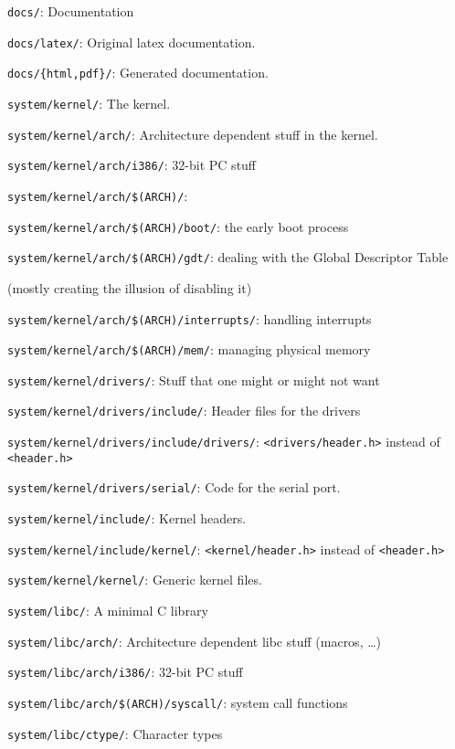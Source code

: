\documentclass[12pt]{article}
\newcommand{\code}[1]{\colorbox{light-gray}{\texttt{#1}}}
\begin{document}
\begin{list}{}{}
\item \code{docs/}: Documentation
\item \code{docs/latex/}: Original latex documentation.
\item \code{docs/\{html,pdf\}/}: Generated documentation.
\item \code{system/kernel/}: The kernel.
\item \code{system/kernel/arch/}: Architecture dependent stuff in the kernel.
\item \code{system/kernel/arch/i386/}: 32-bit PC stuff
\item \code{system/kernel/arch/\$(ARCH)/}:
\item \code{system/kernel/arch/\$(ARCH)/boot/}: the early boot process
\item \code{system/kernel/arch/\$(ARCH)/gdt/}: dealing with the Global Descriptor Table \begin{small}(mostly creating the illusion of disabling it)\end{small}
\item \code{system/kernel/arch/\$(ARCH)/interrupts/}: handling interrupts
\item \code{system/kernel/arch/\$(ARCH)/mem/}: managing physical memory
\item \code{system/kernel/drivers/}: Stuff that one might or might not want
\item \code{system/kernel/drivers/include/}: Header files for the drivers
\item \code{system/kernel/drivers/include/drivers/}: \code{<drivers/header.h>} instead of \code{<header.h>}
\item \code{system/kernel/drivers/serial/}: Code for the serial port.
\item \code{system/kernel/include/}: Kernel headers.
\item \code{system/kernel/include/kernel/}: \code{<kernel/header.h>} instead of \code{<header.h>}
\item \code{system/kernel/kernel/}: Generic kernel files.
\item \code{system/libc/}: A minimal C library
\item \code{system/libc/arch/}: Architecture dependent libc stuff (macros, …)
\item \code{system/libc/arch/i386/}: 32-bit PC stuff
\item \code{system/libc/arch/\$(ARCH)/syscall/}: system call functions
\item \code{system/libc/ctype/}: Character types

\end{list}
\end{document}
